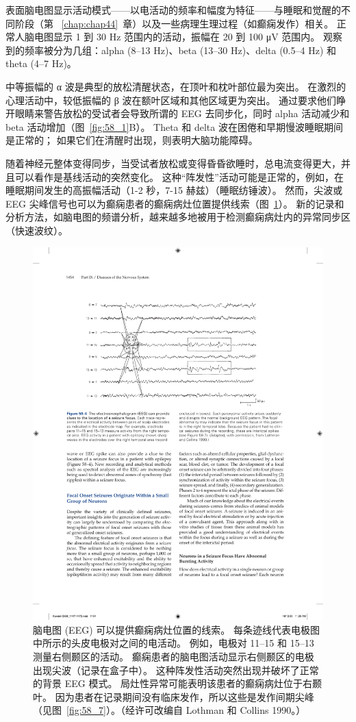 表面脑电图显示活动模式——以电活动的频率和幅度为特征——与睡眠和觉醒的不同阶段（第 ~\ref{chap:chap44}~章）以及一些病理生理过程（如癫痫发作）相关。
正常人脑电图显示 1 到 30 Hz 范围内的活动，振幅在 20 到 100 μV 范围内。
观察到的频率被分为几组：alpha (8–13 Hz)、beta (13–30 Hz)、delta (0.5–4 Hz) 和 theta (4–7 Hz)。


中等振幅的 α 波是典型的放松清醒状态，在顶叶和枕叶部位最为突出。
在激烈的心理活动中，较低振幅的 β 波在额叶区域和其他区域更为突出。
通过要求他们睁开眼睛来警告放松的受试者会导致所谓的 EEG 去同步化，同时 alpha 活动减少和 beta 活动增加（图~\ref{fig:58_1}B）。
Theta 和 delta 波在困倦和早期慢波睡眠期间是正常的；
如果它们在清醒时出现，则表明大脑功能障碍。


随着神经元整体变得同步，当受试者放松或变得昏昏欲睡时，总电流变得更大，并且可以看作是基线活动的突然变化。
这种“阵发性”活动可能是正常的，例如，在睡眠期间发生的高振幅活动（1-2 秒，7-15 赫兹）（睡眠纺锤波）。
然而，尖波或 EEG 尖峰信号也可以为癫痫患者的癫痫病灶位置提供线索（图~\ref{fig:58_4}）。
新的记录和分析方法，如脑电图的频谱分析，越来越多地被用于检测癫痫病灶内的异常同步区（快速波纹）。


\begin{figure}[htbp]
	\centering
	\includegraphics[width=0.8\linewidth]{chap58/fig_58_4}
	\caption{脑电图 (EEG) 可以提供癫痫病灶位置的线索。
		每条迹线代表电极图中所示的头皮电极对之间的电活动。
		例如，电极对 11–15 和 15–13 测量右侧颞区的活动。
		癫痫患者的脑电图活动显示右侧颞区的电极出现尖波（记录在盒子中）。
		这种阵发性活动突然出现并破坏了正常的背景 EEG 模式。
		局灶性异常可能表明该患者的癫痫病灶位于右颞叶。
		因为患者在记录期间没有临床发作，所以这些是发作间期尖峰（见图~\ref{fig:58_7}）。（经许可改编自 Lothman 和 Collins 1990。）}
	\label{fig:58_4}
\end{figure}



